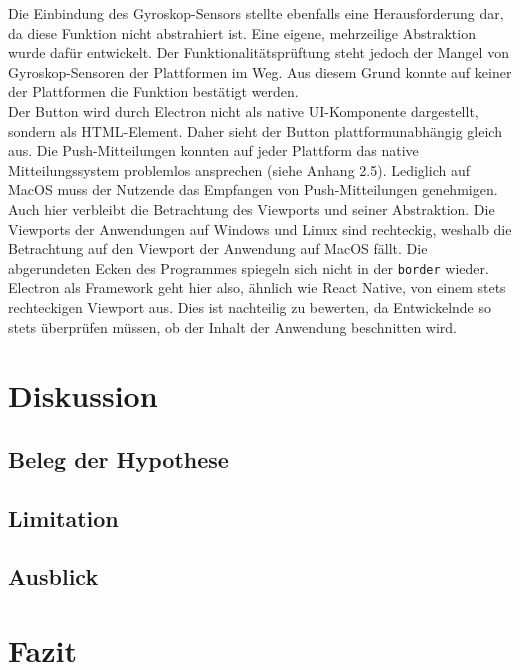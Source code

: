\documentclass[a4paper]{scrartcl}
\begin{document}
Die Einbindung des Gyroskop-Sensors stellte ebenfalls eine Herausforderung dar, da diese Funktion nicht abstrahiert ist. Eine eigene, mehrzeilige Abstraktion wurde dafür entwickelt. Der Funktionalitätsprüftung steht jedoch der Mangel von Gyroskop-Sensoren der Plattformen im Weg. Aus diesem Grund konnte auf keiner der Plattformen die Funktion bestätigt werden. \\

Der Button wird durch Electron nicht als native UI-Komponente dargestellt, sondern als HTML-Element. Daher sieht der Button plattformunabhängig gleich aus. Die Push-Mitteilungen konnten auf jeder Plattform das native Mitteilungssystem problemlos ansprechen (siehe Anhang 2.5). Lediglich auf MacOS muss der Nutzende das Empfangen von Push-Mitteilungen genehmigen. \\

Auch hier verbleibt die Betrachtung des Viewports und seiner Abstraktion. Die Viewports der Anwendungen auf Windows und Linux sind rechteckig, weshalb die Betrachtung auf den Viewport der Anwendung auf MacOS fällt. Die abgerundeten Ecken des Programmes spiegeln sich nicht in der \texttt{border} wieder. Electron als Framework geht hier also, ähnlich wie React Native, von einem stets rechteckigen Viewport aus. Dies ist nachteilig zu bewerten, da Entwickelnde so stets überprüfen müssen, ob der Inhalt der Anwendung beschnitten wird. \\

\section{Diskussion}

\subsection{Beleg der Hypothese}

\subsection{Limitation}

\subsection{Ausblick}

\section{Fazit}
\end{document}
